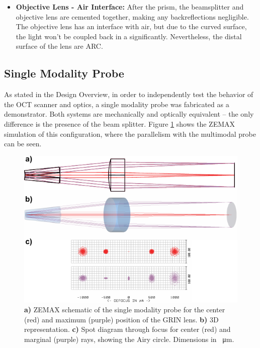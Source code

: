 \begin{itemize}
\item \textbf{Objective Lens - Air Interface:} After the prism, the beamsplitter and objective lens are cemented together, making any backreflections negligible. The objective lens has an interface with air, but due to the curved surface, the light won't be coupled back in a significantly. Nevertheless, the distal surface of the lens are ARC.

\end{itemize}

\subsection{Single Modality Probe}
As stated in the Design Overview, in order to independently test the behavior of the OCT scanner and optics, a single modality probe was fabricated as a demonstrator. Both systems are mechanically and optically equivalent -- the only difference is the presence of the beam splitter. Figure \ref{fig:single} shows the ZEMAX simulation of this configuration, where the parallelism with the multimodal probe can be seen.

\begin{figure}[h!]\centering
      \includegraphics{figures/30_DesignSimulation/Optical/singleAll.pdf}
      \caption{\textbf{a)} ZEMAX schematic of the single modality probe for the center (red) and maximum (purple) position of the GRIN lens.
      \textbf{b)} 3D representation.
      \textbf{c)} Spot diagram through focus for center (red) and marginal (purple) rays, showing the Airy circle. Dimensions in \SI{}{\micro\meter}.}
      \label{fig:single}
\end{figure}



